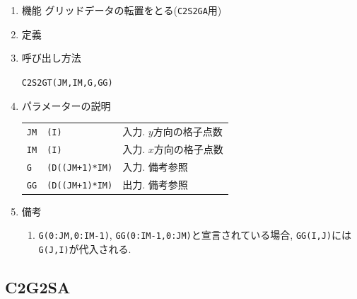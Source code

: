 \documentclass[a4j,fleqn]{jarticle}
\begin{document}
\begin{enumerate}

\item 機能 グリッドデータの転置をとる({\tt C2S2GA}用)

\item 定義

\item 呼び出し方法 

{\tt C2S2GT(JM,IM,G,GG)}

\item パラメーターの説明 
    
\begin{tabular}{lll}
{\tt JM} & {\tt (I)} & 入力. $y$方向の格子点数\\
{\tt IM} & {\tt (I)} & 入力. $x$方向の格子点数\\
{\tt G} & {\tt (D((JM+1)*IM)} & 入力. 備考参照\\
{\tt GG}  & {\tt (D((JM+1)*IM)}    & 出力. 備考参照
\end{tabular}

\item 備考

\begin{enumerate}

 \item {\tt G(0:JM,0:IM-1)}, {\tt GG(0:IM-1,0:JM)}と宣言されている場合,
   {\tt GG(I,J)}には{\tt G(J,I)}が代入される.
   
 \end{enumerate}   

\end{enumerate}   


\subsection{C2G2SA}
\end{document}
